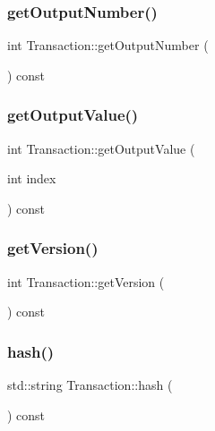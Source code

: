 \subsubsection{\texorpdfstring{get\+Output\+Number()}{getOutputNumber()}}
{\footnotesize\ttfamily int Transaction\+::get\+Output\+Number (\begin{DoxyParamCaption}{ }\end{DoxyParamCaption}) const}

\mbox{\label{classTransaction_a490a7ae3f1520d95f9050ecc7197d1a0}} 
\subsubsection{\texorpdfstring{get\+Output\+Value()}{getOutputValue()}}
{\footnotesize\ttfamily int Transaction\+::get\+Output\+Value (\begin{DoxyParamCaption}\item[{int}]{index }\end{DoxyParamCaption}) const}

\mbox{\label{classTransaction_a133aff45373713e39a7a1317652dc55c}} 
\subsubsection{\texorpdfstring{get\+Version()}{getVersion()}}
{\footnotesize\ttfamily int Transaction\+::get\+Version (\begin{DoxyParamCaption}{ }\end{DoxyParamCaption}) const}

\mbox{\label{classTransaction_a99a851c61b60c1dd15b3e9bdd50f32f6}} 
\subsubsection{\texorpdfstring{hash()}{hash()}}
{\footnotesize\ttfamily std\+::string Transaction\+::hash (\begin{DoxyParamCaption}{ }\end{DoxyParamCaption}) const}

